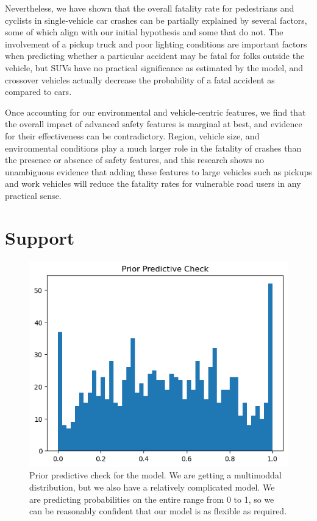 \documentclass[12pt]{article}
\begin{document}
Nevertheless, we have shown that the overall fatality rate for pedestrians and cyclists in single-vehicle car
crashes can be partially explained by several factors, some of which align with our initial hypothesis and
some that do not. The involvement of a pickup truck and poor lighting conditions are important factors
when predicting whether a particular accident may be fatal for folks outside the vehicle, but SUVs have no practical
significance as estimated by the model, and crossover vehicles actually decrease the probability of a fatal accident
as compared to cars.

Once accounting for our environmental and vehicle-centric features, we find that the overall impact
of advanced safety features is marginal at best, and evidence for their effectiveness
can be contradictory. Region, vehicle size, and environmental conditions play a much
larger role in the fatality of crashes than the presence or absence of safety features, and this research
shows no unambiguous evidence that adding these features to large vehicles such as pickups
and work vehicles will reduce the fatality rates for vulnerable road users in any practical sense.

\section{Support}

\begin{figure}[h]
    \centering
    \includegraphics[width=\textwidth]{images/prior_predictive_check.png}
    \caption{Prior predictive check for the model. We are getting a multimoddal distribution, but we
        also have a relatively complicated model. We are predicting probabilities on the entire
        range from 0 to 1, so we can be reasonably confident that our model is as flexible as required.}
    \label{fig:ppc}
\end{figure}
\end{document}
